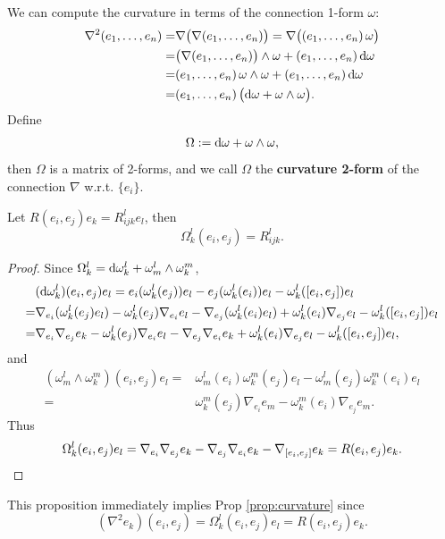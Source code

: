 We can compute the curvature in terms of the connection 1-form $\omega$:
\begin{align*}
    \nabla^2 ({e}_{1},\dots,{e}_{n}) =& \nabla\big(\nabla({e}_{1},\dots,{e}_{n})\big) 
    = \nabla\big(({e}_{1},\dots,{e}_{n})\,\omega\big) \\
    =& \big(\nabla({e}_{1},\dots,{e}_{n})\big)\wedge \omega + ({e}_{1},\dots,{e}_{n})\, {\rm d}\omega \\
    =& ({e}_{1},\dots,{e}_{n})\,\omega\wedge \omega + ({e}_{1},\dots,{e}_{n})\, {\rm d}\omega \\
    =& ({e}_{1},\dots,{e}_{n})\,\big({\rm d}\omega + \omega\wedge \omega\big).
\end{align*}
Define 
\begin{equation}\label{eq:curvature-form}
    \Omega := {\rm d}\omega + \omega\wedge \omega,
\end{equation}
then $\Omega$ is a matrix of 2-forms, and we call 
$\Omega$ the \textbf{curvature 2-form} of the connection $\nabla$ w.r.t. $\{e_i\}$. 
\begin{proposition}
    Let $R(e_i,e_j)e_k = R_{ijk}^l e_l$, then
    \begin{equation*}
        \Omega_k^l(e_i,e_j) = R_{ijk}^l.
    \end{equation*}
\end{proposition}
\begin{proof}
    Since $\Omega_k^l = {\rm d}\omega_k^l + \omega_m^l \wedge \omega_k^m$, 
    \begin{align*}
        &({\rm d}\omega^l_k)(e_i,e_j)e_l = e_i(\omega_k^l(e_j))e_l - e_j(\omega_k^l(e_i))e_l - \omega_k^l([e_i,e_j])e_l \\
        =& \nabla_{e_i}(\omega_k^l(e_j)e_l) - \omega_k^l(e_j)\nabla_{e_i} e_l - \nabla_{e_j}(\omega_k^l(e_i)e_l) + \omega_k^l(e_i)\nabla_{e_j} e_l - \omega_k^l([e_i,e_j])e_l \\
        =& \nabla_{e_i} \nabla_{e_j} e_k - \omega_k^l(e_j)\nabla_{e_i} e_l - \nabla_{e_j} \nabla_{e_i} e_k + \omega_k^l(e_i)\nabla_{e_j} e_l - \omega_k^l([e_i,e_j])e_l,
    \end{align*}
    and 
    \begin{align*}
        (\omega_m^l \wedge \omega_k^m)(e_i,e_j)e_l =& \omega_m^l(e_i)\omega_k^m(e_j)e_l - \omega_m^l(e_j)\omega_k^m(e_i)e_l \\
        =& \omega^m_k(e_j)\nabla_{e_i} e_m - \omega^m_k(e_i)\nabla_{e_j} e_m.
    \end{align*}
    Thus 
    \begin{equation*}
        \Omega_k^l(e_i,e_j)e_l 
        = \nabla_{e_i}\nabla_{e_j}e_k - \nabla_{e_j}\nabla_{e_i}e_k 
        - \nabla_{[e_i,e_j]}e_k = R(e_i,e_j)e_k. \qedhere
    \end{equation*}
\end{proof}
\begin{corollary}
    This proposition immediately implies Prop \ref{prop:curvature} since
    \begin{equation*}
        (\nabla^2 e_k)(e_i,e_j) = \Omega_k^l(e_i,e_j)e_l = R(e_i,e_j)e_k. 
    \end{equation*}
\end{corollary}

